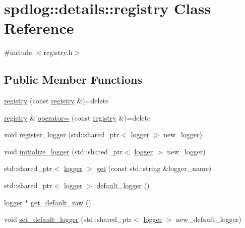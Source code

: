 \hypertarget{classspdlog_1_1details_1_1registry}{}\section{spdlog\+:\+:details\+:\+:registry Class Reference}
\label{classspdlog_1_1details_1_1registry}


{\ttfamily \#include $<$registry.\+h$>$}

\subsection*{Public Member Functions}
\begin{DoxyCompactItemize}
\item 
\hyperlink{classspdlog_1_1details_1_1registry_ab5c1a2f7b8e2e9eec4e0fa75d9167f3b}{registry} (const \hyperlink{classspdlog_1_1details_1_1registry}{registry} \&)=delete
\item 
\hyperlink{classspdlog_1_1details_1_1registry}{registry} \& \hyperlink{classspdlog_1_1details_1_1registry_a12da238b4eda17829b194b36f383e8a0}{operator=} (const \hyperlink{classspdlog_1_1details_1_1registry}{registry} \&)=delete
\item 
void \hyperlink{classspdlog_1_1details_1_1registry_ab77fb7513b2e3e6442a83f037543e391}{register\+\_\+logger} (std\+::shared\+\_\+ptr$<$ \hyperlink{classspdlog_1_1logger}{logger} $>$ new\+\_\+logger)
\item 
void \hyperlink{classspdlog_1_1details_1_1registry_a7e015c41e9c32c9f1e8e7f9adc578cee}{initialize\+\_\+logger} (std\+::shared\+\_\+ptr$<$ \hyperlink{classspdlog_1_1logger}{logger} $>$ new\+\_\+logger)
\item 
std\+::shared\+\_\+ptr$<$ \hyperlink{classspdlog_1_1logger}{logger} $>$ \hyperlink{classspdlog_1_1details_1_1registry_a43cb4919dd9f66cf4eeeeaf9774caade}{get} (const std\+::string \&logger\+\_\+name)
\item 
std\+::shared\+\_\+ptr$<$ \hyperlink{classspdlog_1_1logger}{logger} $>$ \hyperlink{classspdlog_1_1details_1_1registry_af6c1f16e0433b6400aef5219fa1b81ea}{default\+\_\+logger} ()
\item 
\hyperlink{classspdlog_1_1logger}{logger} $\ast$ \hyperlink{classspdlog_1_1details_1_1registry_a1fd3bc96c2a7be1af1841f5980cd5f4c}{get\+\_\+default\+\_\+raw} ()
\item 
void \hyperlink{classspdlog_1_1details_1_1registry_ae2a45628046a1d0cd3f8de81a5556acb}{set\+\_\+default\+\_\+logger} (std\+::shared\+\_\+ptr$<$ \hyperlink{classspdlog_1_1logger}{logger} $>$ new\+\_\+default\+\_\+logger)

\end{DoxyCompactItemize}
